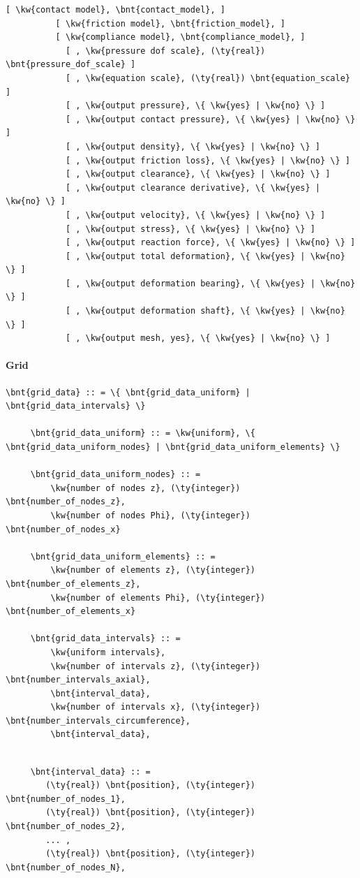 \begin{Verbatim}[commandchars=\\\{\}]
          [ \kw{contact model}, \bnt{contact_model}, ]
          [ \kw{friction model}, \bnt{friction_model}, ]
          [ \kw{compliance model}, \bnt{compliance_model}, ]
            [ , \kw{pressure dof scale}, (\ty{real}) \bnt{pressure_dof_scale} ]
            [ , \kw{equation scale}, (\ty{real}) \bnt{equation_scale} ]
            [ , \kw{output pressure}, \{ \kw{yes} | \kw{no} \} ]
            [ , \kw{output contact pressure}, \{ \kw{yes} | \kw{no} \} ]
            [ , \kw{output density}, \{ \kw{yes} | \kw{no} \} ]
            [ , \kw{output friction loss}, \{ \kw{yes} | \kw{no} \} ]
            [ , \kw{output clearance}, \{ \kw{yes} | \kw{no} \} ]
            [ , \kw{output clearance derivative}, \{ \kw{yes} | \kw{no} \} ]
            [ , \kw{output velocity}, \{ \kw{yes} | \kw{no} \} ]
            [ , \kw{output stress}, \{ \kw{yes} | \kw{no} \} ]
            [ , \kw{output reaction force}, \{ \kw{yes} | \kw{no} \} ]
            [ , \kw{output total deformation}, \{ \kw{yes} | \kw{no} \} ]
            [ , \kw{output deformation bearing}, \{ \kw{yes} | \kw{no} \} ]
            [ , \kw{output deformation shaft}, \{ \kw{yes} | \kw{no} \} ]
            [ , \kw{output mesh, yes}, \{ \kw{yes} | \kw{no} \} ]

\end{Verbatim}
\paragraph{Grid}
\begin{Verbatim}[commandchars=\\\{\}]
     \bnt{grid_data} :: = \{ \bnt{grid_data_uniform} | \bnt{grid_data_intervals} \}

     \bnt{grid_data_uniform} :: = \kw{uniform}, \{ \bnt{grid_data_uniform_nodes} | \bnt{grid_data_uniform_elements} \}

     \bnt{grid_data_uniform_nodes} :: =
         \kw{number of nodes z}, (\ty{integer}) \bnt{number_of_nodes_z},
         \kw{number of nodes Phi}, (\ty{integer}) \bnt{number_of_nodes_x}

     \bnt{grid_data_uniform_elements} :: =
         \kw{number of elements z}, (\ty{integer}) \bnt{number_of_elements_z},
         \kw{number of elements Phi}, (\ty{integer}) \bnt{number_of_elements_x}

     \bnt{grid_data_intervals} :: =
         \kw{uniform intervals},
         \kw{number of intervals z}, (\ty{integer}) \bnt{number_intervals_axial},
         \bnt{interval_data},
         \kw{number of intervals x}, (\ty{integer}) \bnt{number_intervals_circumference},
         \bnt{interval_data},
\end{Verbatim}
\begin{Verbatim}[commandchars=\\\{\}]

     \bnt{interval_data} :: =
        (\ty{real}) \bnt{position}, (\ty{integer}) \bnt{number_of_nodes_1},
        (\ty{real}) \bnt{position}, (\ty{integer}) \bnt{number_of_nodes_2},
        ... ,
        (\ty{real}) \bnt{position}, (\ty{integer}) \bnt{number_of_nodes_N},

\end{Verbatim}
